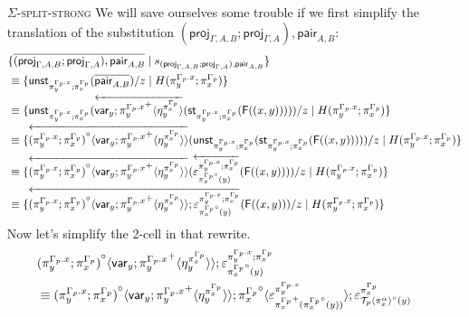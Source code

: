 \documentclass[10pt]{article}
\theoremstyle{definition}
\newcommand{\rewrite}[2]{\overleftarrow{#1}(#2)}
\newcommand\StI[2]{\ensuremath{\mathsf{st}_{#1}(#2)}}
\newcommand\UnSt[2]{\ensuremath{\mathsf{unst}_{#1}(#2)}}
\newcommand\FI[1]{\ensuremath{\mathsf{F}{(#1)}}}
\newcommand\TrPlus[2]{\ensuremath{{#1}^+(#2)}}
\newcommand\TrCirc[2]{\ensuremath{{#1}^\circ(#2)}}
\newcommand\proj[1]{\ensuremath{\mathsf{proj}_{#1}}}
\newcommand\var[1]{\ensuremath{\mathsf{var}_{#1}}}
\newcommand\ApEl[2]{\mathcal{T}_{#1}\langle#2\rangle}
\newcommand\ApPlus[2]{\ensuremath{{#1}^+ \langle #2 \rangle }}
\newcommand\ApCirc[2]{\ensuremath{{#1}^\circ \langle #2 \rangle }}
\begin{document}
\begin{enumerate}[style = multiline, labelwidth = 80pt]
\item[\textsc{$\Sigma$-split-strong}] We will save ourselves some trouble if we first simplify the translation of the substitution $(\proj{\Gamma, A, B};\proj{\Gamma, A}), \mathsf{pair}_{A,B}$:
\begin{align*}
&\{ \upstairs{(\proj{\Gamma, A, B};\proj{\Gamma, A}), \mathsf{pair}_{A,B}} \mid s_{(\proj{\Gamma, A, B};\proj{\Gamma, A}), \mathsf{pair}_{A,B}} \} \\
&\equiv \{ \UnSt{\pi^{\asdep{\Gamma}.x}_y;\pi^{\asdep{\Gamma}}_x}{\upstairs{\mathsf{pair}_{A,B}}}/z \mid H(\pi^{\asdep{\Gamma}.x}_y;\pi^{\asdep{\Gamma}}_x) \}  \\
&\equiv \{ \UnSt{\pi^{\asdep{\Gamma}.x}_y;\pi^{\asdep{\Gamma}}_x}{\rewrite{\var{y};\ApPlus{\pi^{\asdep{\Gamma}.x}_y}{\eta^{\pi^{\asdep{\Gamma}}_x}_y}}{\StI{\pi^{\asdep{\Gamma}.x}_y;\pi^{\asdep{\Gamma}}_x}{\FI{(x, y)}}}}/z \mid H(\pi^{\asdep{\Gamma}.x}_y;\pi^{\asdep{\Gamma}}_x) \}  \\
&\equiv \{ \rewrite{\ApCirc{(\pi^{\asdep{\Gamma}.x}_y;\pi^{\asdep{\Gamma}}_x)}{\var{y};\ApPlus{\pi^{\asdep{\Gamma}.x}_y}{\eta^{\pi^{\asdep{\Gamma}}_x}_y}}}{\UnSt{\pi^{\asdep{\Gamma}.x}_y;\pi^{\asdep{\Gamma}}_x}{\StI{\pi^{\asdep{\Gamma}.x}_y;\pi^{\asdep{\Gamma}}_x}{\FI{(x, y)}}}}/z \mid H(\pi^{\asdep{\Gamma}.x}_y;\pi^{\asdep{\Gamma}}_x) \}  \\
&\equiv \{ \rewrite{\ApCirc{(\pi^{\asdep{\Gamma}.x}_y;\pi^{\asdep{\Gamma}}_x)}{\var{y};\ApPlus{\pi^{\asdep{\Gamma}.x}_y}{\eta^{\pi^{\asdep{\Gamma}}_x}_y}}}{\rewrite{\varepsilon^{\pi^{\asdep{\Gamma}.x}_y;\pi^{\asdep{\Gamma}}_x}_{\TrCirc{\pi^{\asdep{\Gamma}}_x}{y}}}{\FI{(x, y)}}}/z \mid H(\pi^{\asdep{\Gamma}.x}_y;\pi^{\asdep{\Gamma}}_x) \}  \\
&\equiv \{ \rewrite{\ApCirc{(\pi^{\asdep{\Gamma}.x}_y;\pi^{\asdep{\Gamma}}_x)}{\var{y};\ApPlus{\pi^{\asdep{\Gamma}.x}_y}{\eta^{\pi^{\asdep{\Gamma}}_x}_y}};\varepsilon^{\pi^{\asdep{\Gamma}.x}_y;\pi^{\asdep{\Gamma}}_x}_{\TrCirc{\pi^{\asdep{\Gamma}}_x}{y}}}{\FI{(x, y)}}/z \mid H(\pi^{\asdep{\Gamma}.x}_y;\pi^{\asdep{\Gamma}}_x) \} 
\end{align*}
Now let's simplify the 2-cell in that rewrite.
\begin{align*}
&\ApCirc{(\pi^{\asdep{\Gamma}.x}_y;\pi^{\asdep{\Gamma}}_x)}{\var{y};\ApPlus{\pi^{\asdep{\Gamma}.x}_y}{\eta^{\pi^{\asdep{\Gamma}}_x}_y}};\varepsilon^{\pi^{\asdep{\Gamma}.x}_y;\pi^{\asdep{\Gamma}}_x}_{\TrCirc{\pi^{\asdep{\Gamma}}_x}{y}} \\
&\equiv \ApCirc{(\pi^{\asdep{\Gamma}.x}_y;\pi^{\asdep{\Gamma}}_x)}{\var{y};\ApPlus{\pi^{\asdep{\Gamma}.x}_y}{\eta^{\pi^{\asdep{\Gamma}}_x}_y}};\ApCirc{\pi^{\asdep{\Gamma}}_x}{\varepsilon^{\pi^{\asdep{\Gamma}.x}_y}_{\TrPlus{\pi^{\asdep{\Gamma}}_x}{\TrCirc{\pi^{\asdep{\Gamma}}_x}{y}}}};\varepsilon^{\pi^{\asdep{\Gamma}}_x}_{\TrCirc{\ApEl{p}{\pi^\alpha_x}}{y}} \\

\end{align*}
\end{enumerate}
\end{document}

